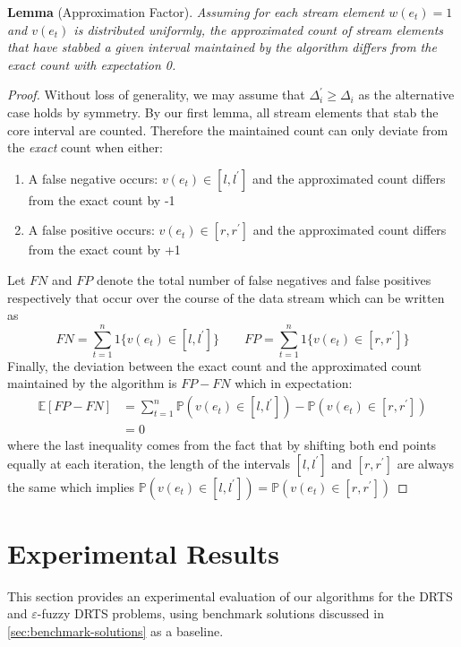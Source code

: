 \textbf{Lemma} (Approximation Factor). \textit{Assuming for each stream element $w(e_t)=1$ and $v(e_t)$ is distributed uniformly, the approximated count of stream elements that have stabbed a given interval maintained by the algorithm differs from the exact count with expectation 0.} 
\begin{proof}
    Without loss of generality, we may assume that $\Delta_i^\prime \geq \Delta_i$ as the alternative case holds by symmetry. 
    By our first lemma, all stream elements that stab the core interval are counted. Therefore the maintained count can only deviate from the \textit{exact} count when either: 
    \begin{enumerate}
        \item A false negative occurs: $v(e_t) \in [l, l^\prime]$ and the approximated count differs from the exact count by -1
        \item A false positive occurs: $v(e_t) \in [r, r^\prime]$ and the approximated count differs from the exact count by +1
    \end{enumerate}
    Let $FN$ and $FP$ denote the total number of false negatives and false positives respectively that occur over the course of the data stream which can be written as
    $$FN = \sum_{t=1}^{n}1\{v(e_t) \in [l, l^\prime]\} \quad \quad FP = \sum_{t=1}^{n}1\{v(e_t) \in [r, r^\prime]\}$$
    Finally, the deviation between the exact count and the approximated count maintained by the algorithm is $FP - FN$ which in expectation:
    \begin{align*}
        \mathbb{E}[FP - FN] &= \sum_{t=1}^{n} \mathbb{P}(v(e_t) \in [l, l^\prime]) - \mathbb{P}(v(e_t) \in [r, r^\prime]) \\
        &= 0
    \end{align*}
    where the last inequality comes from the fact that by shifting both end points equally at each iteration, the length of the intervals $[l, l^\prime]$ and $[r, r^\prime]$ are always the same which implies $\mathbb{P}(v(e_t) \in [l, l^\prime]) = \mathbb{P}(v(e_t) \in [r, r^\prime])$
\end{proof} 

\newpage
\section{Experimental Results}
\label{sec:experimental-results}
This section provides an experimental evaluation of our algorithms for the DRTS and $\varepsilon$-fuzzy DRTS problems, using benchmark solutions discussed in \cref{sec:benchmark-solutions} as a baseline. 

